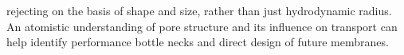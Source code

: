rejecting on the basis of shape and size, rather than just hydrodynamic
radius. An atomistic understanding of pore structure and its influence on
transport can help identify performance bottle necks and direct design of
future membranes. 

